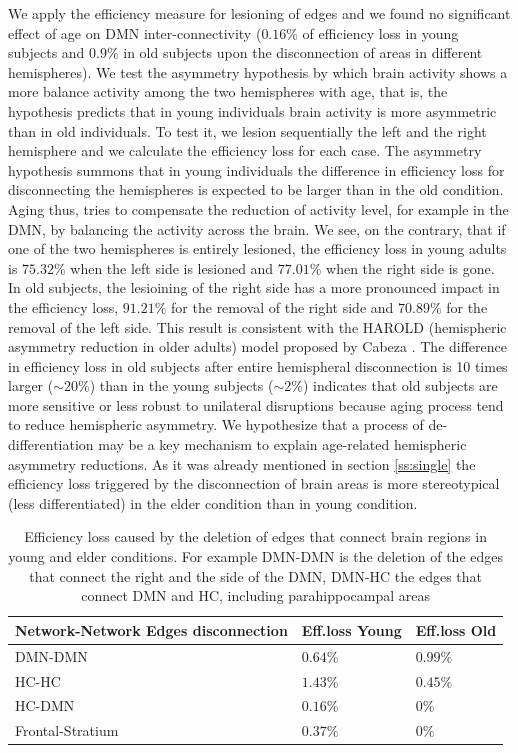 \documentclass[12pt,a4paper]{article}
\begin{document}
We apply the efficiency measure for lesioning of edges and we found no significant effect of age on DMN inter-connectivity ($0.16\%$ of efficiency loss in young subjects and $0.9\%$ in old subjects upon the disconnection of areas in different hemispheres).   
We test the asymmetry hypothesis by which brain activity shows a more balance activity among the two hemispheres with age, that is, the hypothesis predicts that in young individuals brain activity is more asymmetric than in old individuals. To test it, we lesion sequentially the left and the right hemisphere and we calculate the efficiency loss for each case. The asymmetry hypothesis summons that in young individuals the difference in efficiency loss for disconnecting the hemispheres is expected to be larger than in the old condition. Aging thus, tries to compensate the reduction of activity level, for example in the DMN, by balancing the activity across the brain. 
We see, on the contrary, that if one of the two hemispheres is entirely lesioned, the efficiency loss in young adults is $75.32\%$ when the left side is lesioned and $77.01\%$ when the right side is gone. 
In old subjects, the lesioining of the right side has a more pronounced impact in the efficiency loss, $91.21\%$ for the removal of the right side and $70.89\%$ for the removal of the left side. 
This result is consistent with the HAROLD (hemispheric asymmetry reduction in older adults) model proposed by  
Cabeza \cite{cabeza_aging_2002}. The difference in efficiency loss in old subjects after entire hemispheral disconnection 
is 10 times larger ($\sim 20\%$) than in the young subjects ($\sim 2\%$) indicates that old subjects are more sensitive or less robust to unilateral disruptions because aging process tend to reduce hemispheric asymmetry.
We hypothesize that a process of de-differentiation may be a key mechanism to explain age-related hemispheric asymmetry reductions. As it was already mentioned in section \ref{ss:single}  the efficiency loss triggered by the disconnection of brain areas is more stereotypical (less differentiated) in the elder condition than in young condition.

\begin{table}[!htbp]
\centering%
\caption{Efficiency loss caused by the deletion of edges that connect brain regions in young and elder conditions. For example DMN-DMN is the deletion of the edges that connect the right and the side of the DMN, DMN-HC the edges that connect DMN and HC, including parahippocampal areas}
\begin{tabularx}{\linewidth}{XXX}
\toprule
Network-Network Edges disconnection & Eff.loss Young & Eff.loss Old\\
\midrule
\midrule
DMN-DMN & $0.64\%$& $0.99\%$\\
\midrule
HC-HC & $1.43\%$& $0.45\%$\\
\midrule
HC-DMN & $0.16\%$& $0\%$\\
\midrule
Frontal-Stratium & $0.37\%$& $0\%$\\
\bottomrule
\end{tabularx}
\label{tab:edges}
\end{table}
\end{document}
